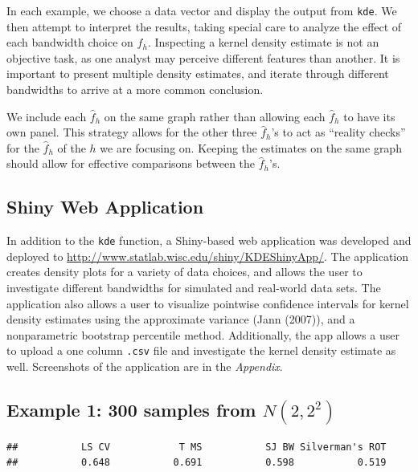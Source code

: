 \documentclass[]{article}
\begin{document}
In each example, we choose a data vector and display the output from
\texttt{kde}. We then attempt to interpret the results, taking special
care to analyze the effect of each bandwidth choice on \(\hat{f}_h\).
Inspecting a kernel density estimate is not an objective task, as one
analyst may perceive different features than another. It is important to
present multiple density estimates, and iterate through different
bandwidths to arrive at a more common conclusion.

We include each \(\hat f_h\) on the same graph rather than allowing each
\(\hat f_h\) to have its own panel. This strategy allows for the other
three \(\hat f_h\)'s to act as ``reality checks'' for the \(\hat f_h\)
of the \(h\) we are focusing on. Keeping the estimates on the same graph
should allow for effective comparisons between the \(\hat f_h\)'s.

\subsection{Shiny Web Application}

In addition to the \texttt{kde} function, a Shiny-based web application
was developed and deployed to
\url{http://www.statlab.wisc.edu/shiny/KDEShinyApp/}. The application
creates density plots for a variety of data choices, and allows the user
to investigate different bandwidths for simulated and real-world data
sets. The application also allows a user to visualize pointwise
confidence intervals for kernel density estimates using the approximate
variance (Jann (2007)), and a nonparametric bootstrap percentile method.
Additionally, the app allows a user to upload a one column \texttt{.csv}
file and investigate the kernel density estimate as well. Screenshots of
the application are in the \emph{Appendix}.

\subsection{Example 1: 300 samples from $N(2, 2^2)$}

\begin{verbatim}
##           LS CV            T MS           SJ BW Silverman's ROT 
##           0.648           0.691           0.598           0.519
\end{verbatim}
\end{document}
